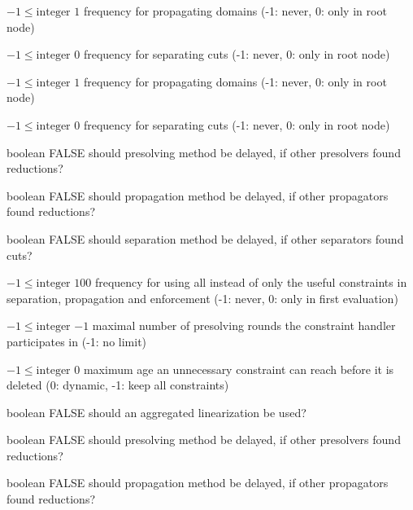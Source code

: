 %
{$-1\leq\textrm{integer}$}%
{$1$}%
{frequency for propagating domains (-1: never, 0: only in root node)}%
{}

%
{$-1\leq\textrm{integer}$}%
{$0$}%
{frequency for separating cuts (-1: never, 0: only in root node)}%
{}

%
{$-1\leq\textrm{integer}$}%
{$1$}%
{frequency for propagating domains (-1: never, 0: only in root node)}%
{}

%
{$-1\leq\textrm{integer}$}%
{$0$}%
{frequency for separating cuts (-1: never, 0: only in root node)}%
{}

%
{boolean}%
{FALSE}%
{should presolving method be delayed, if other presolvers found reductions?}%
{}

%
{boolean}%
{FALSE}%
{should propagation method be delayed, if other propagators found reductions?}%
{}

%
{boolean}%
{FALSE}%
{should separation method be delayed, if other separators found cuts?}%
{}

%
{$-1\leq\textrm{integer}$}%
{$100$}%
{frequency for using all instead of only the useful constraints in separation, propagation and enforcement (-1: never, 0: only in first evaluation)}%
{}

%
{$-1\leq\textrm{integer}$}%
{$-1$}%
{maximal number of presolving rounds the constraint handler participates in (-1: no limit)}%
{}

%
{$-1\leq\textrm{integer}$}%
{$0$}%
{maximum age an unnecessary constraint can reach before it is deleted (0: dynamic, -1: keep all constraints)}%
{}

%
{boolean}%
{FALSE}%
{should an aggregated linearization be used?}%
{}

%
{boolean}%
{FALSE}%
{should presolving method be delayed, if other presolvers found reductions?}%
{}

%
{boolean}%
{FALSE}%
{should propagation method be delayed, if other propagators found reductions?}%
{}

